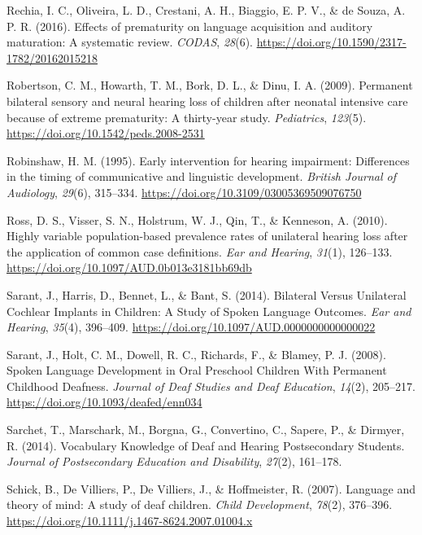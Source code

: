 \documentclass[english,man]{apa6}
\begin{document}
\leavevmode\hypertarget{ref-rechia2016}{}%
Rechia, I. C., Oliveira, L. D., Crestani, A. H., Biaggio, E. P. V., \& de Souza, A. P. R. (2016). Effects of prematurity on language acquisition and auditory maturation: A systematic review. \emph{CODAS}, \emph{28}(6). \url{https://doi.org/10.1590/2317-1782/20162015218}

\leavevmode\hypertarget{ref-robertson2009}{}%
Robertson, C. M., Howarth, T. M., Bork, D. L., \& Dinu, I. A. (2009). Permanent bilateral sensory and neural hearing loss of children after neonatal intensive care because of extreme prematurity: A thirty-year study. \emph{Pediatrics}, \emph{123}(5). \url{https://doi.org/10.1542/peds.2008-2531}

\leavevmode\hypertarget{ref-robinshaw1995}{}%
Robinshaw, H. M. (1995). Early intervention for hearing impairment: Differences in the timing of communicative and linguistic development. \emph{British Journal of Audiology}, \emph{29}(6), 315--334. \url{https://doi.org/10.3109/03005369509076750}

\leavevmode\hypertarget{ref-ross2010}{}%
Ross, D. S., Visser, S. N., Holstrum, W. J., Qin, T., \& Kenneson, A. (2010). Highly variable population-based prevalence rates of unilateral hearing loss after the application of common case definitions. \emph{Ear and Hearing}, \emph{31}(1), 126--133. \url{https://doi.org/10.1097/AUD.0b013e3181bb69db}

\leavevmode\hypertarget{ref-sarant2014}{}%
Sarant, J., Harris, D., Bennet, L., \& Bant, S. (2014). Bilateral Versus Unilateral Cochlear Implants in Children: A Study of Spoken Language Outcomes. \emph{Ear and Hearing}, \emph{35}(4), 396--409. \url{https://doi.org/10.1097/AUD.0000000000000022}

\leavevmode\hypertarget{ref-sarant2008}{}%
Sarant, J., Holt, C. M., Dowell, R. C., Richards, F., \& Blamey, P. J. (2008). Spoken Language Development in Oral Preschool Children With Permanent Childhood Deafness. \emph{Journal of Deaf Studies and Deaf Education}, \emph{14}(2), 205--217. \url{https://doi.org/10.1093/deafed/enn034}

\leavevmode\hypertarget{ref-sarchet2014}{}%
Sarchet, T., Marschark, M., Borgna, G., Convertino, C., Sapere, P., \& Dirmyer, R. (2014). Vocabulary Knowledge of Deaf and Hearing Postsecondary Students. \emph{Journal of Postsecondary Education and Disability}, \emph{27}(2), 161--178.

\leavevmode\hypertarget{ref-schick2007}{}%
Schick, B., De Villiers, P., De Villiers, J., \& Hoffmeister, R. (2007). Language and theory of mind: A study of deaf children. \emph{Child Development}, \emph{78}(2), 376--396. \url{https://doi.org/10.1111/j.1467-8624.2007.01004.x}
\end{document}
